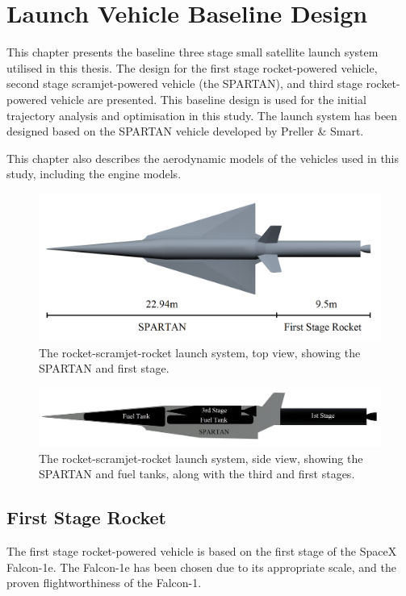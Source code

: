 
\cleardoublepage
\chapter{Launch Vehicle Baseline Design}\label{chapter:methodology}

This chapter presents the baseline three stage small satellite launch system utilised in this thesis. The design for the first stage rocket-powered vehicle, second stage scramjet-powered vehicle (the SPARTAN), and third stage rocket-powered vehicle are presented. This baseline design is used for the initial trajectory analysis and optimisation in this study. The launch system has been designed based on the SPARTAN vehicle developed by Preller \& Smart.

This chapter also describes the aerodynamic models of the vehicles used in this study, including the engine models.


\begin{figure}
\centering
\includegraphics[width=0.7\linewidth]{figures/3_vehicle_design/NoInternal}
\caption{The rocket-scramjet-rocket launch system, top view, showing the SPARTAN and first stage.}
\label{fig:NoInternal}
\end{figure}

\begin{figure}
\centering
\includegraphics[width=0.7\linewidth]{figures/3_vehicle_design/INTERNALS}
\caption{The rocket-scramjet-rocket launch system, side view, showing the SPARTAN and fuel tanks, along with the third and first stages.}
\label{fig:INTERNALS}
\end{figure}


\section{First Stage Rocket}
The first stage rocket-powered vehicle is based on the first stage of the SpaceX Falcon-1e. The Falcon-1e has been chosen due to its appropriate scale, and the proven flightworthiness of the Falcon-1.

